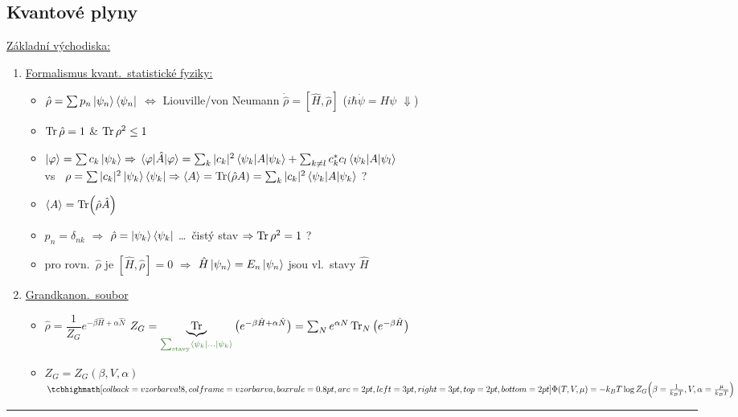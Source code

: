 \subsection{Kvantové plyny}
\underline{Základní východiska:}
\begin{enumerate}[label=\arabic*)]
  \item \underline{Formalismus kvant.\ statistické fyziky:}
  \begin{itemize}
    \item[$\to$] $\hat\rho = \sum p_n\ket{\psi_n}\bra{\psi_n}$ \quad $\Leftrightarrow$ \quad Liouville/von Neumann \quad
                 $\dot{\hat\rho} = [\hat H,\hat\rho]$
                 \quad \textcolor{OliveGreen}{($i\hbar\dot\psi = H\psi$ $\Downarrow$)}
    \item[$\to$] $\Tr\hat\rho = 1$ \& $\Tr\rho^2 \leq 1$
    \item[] \textcolor{NavyBlue}{\small $\ket{\varphi} = \sum c_k\ket{\psi_k} \Rightarrow \mel{\varphi}{\hat A}{\varphi} = \sum_k|c_k|^2\mel{\psi_k}{A}{\psi_k} + \sum_{k\neq l}c_k^*c_l\mel{\psi_k}{A}{\psi_l}$ \\
                 vs \ $\rho = \sum|c_k|^2\ket{\psi_k}\bra{\psi_k} \Rightarrow \langle A\rangle = \Tr(\hat\rho A) = \sum_k|c_k|^2\mel{\psi_k}{A}{\psi_k}$ ?}
    \item[$\to$] $\langle A\rangle = \Tr(\hat\rho\hat A)$
    \item[$\to$] $p_n = \delta_{nk}$ $\Rightarrow$ $\hat\rho = \ket{\psi_k}\bra{\psi_k}$ \quad \dots\ čistý stav \textcolor{OliveGreen}{$\Rightarrow \Tr\rho^2 = 1$ ?}
    \item[$\to$] pro rovn.\ $\hat\rho$ je $[\hat H,\hat\rho] = 0$ $\Rightarrow$ $\hat H\ket{\psi_n} = E_n\ket{\psi_n}$ jsou vl.\ stavy $\hat H$
  \end{itemize}
  \item \underline{Grandkanon.\ soubor}
  \begin{itemize}
    \item $\hat\rho = \dfrac{1}{Z_G}e^{-\beta\hat H + \alpha\hat N}$ \qquad
          $Z_G = \underbrace{\Tr}_{\textcolor{OliveGreen}{\sum_{\text{stavy}}\bra{\psi_k}\dots\ket{\psi_k}}}\big(e^{-\beta\hat H + \alpha\hat N}\big) = \sum_N e^{\alpha N}\Tr_N\big(e^{-\beta\hat H}\big)$
    \item $Z_G = Z_G(\beta,V,\alpha)$ \qquad
          $\vzorec{\Phi(T,V,\mu) = -k_BT\log Z_G\Big(\beta = \tfrac{1}{k_BT}, V, \alpha = \tfrac{\mu}{k_BT}\Big)}$
  \end{itemize}
\end{enumerate}
\noindent\rule{0.35\linewidth}{0.4pt}

